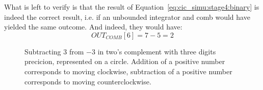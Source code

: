 What     is     left    to     verify     is     that    the     result     of
Equation~\ref{eq:cic_simu:stage4:binary} is indeed the correct result, i.e. if
an  unbounded integrator  and comb  would have  yielded the  same outcome. And
indeed, they would have:
\begin{equation}
    \label{eq:cic_simu:stage4:decimal:unbounded}
    OUT_{COMB}[6] = 7 - 5 = 2
\end{equation}

\begin{figure}
    \centering
    
    \caption[Two's Complement Circle]{%
        Subtracting  $3$  from $-3$  in  two's  complement with  three  digits
        precicion,  represented on  a  circle. Addition of  a positive  number
        corresponds  to moving  clockwise,  subtraction of  a positive  number
        corresponds to moving counterclockwise.%
    }
    \label{fig:cic_simu:twos_complement_circle}
\end{figure}

